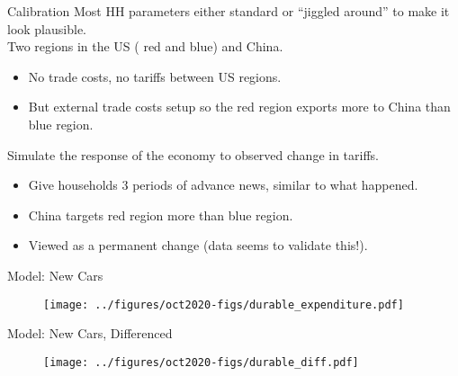 \documentclass[9pt,pdftex,aspectratio=1610]{beamer}
\theoremstyle{definition}
\begin{document}
\begin{frame}[t]{Calibration}
\medskip
Most HH parameters either standard or ``jiggled around'' to make it look plausible.\\
\bigskip
Two regions in the US ({\color{red} red} and {\color{blue} blue}) and China.
\begin{itemize}
\smallskip
\item No trade costs, no tariffs between US regions.
\smallskip
\item But external trade costs setup so the {\color{red} red} region exports more to China than {\color{blue} blue} region.
\end{itemize}
\bigskip
Simulate the response of the economy to observed change in tariffs.
\begin{itemize}
\smallskip
\item Give households 3 periods of advance news, similar to what happened.
\smallskip
\item China targets {\color{red} red} region more than {\color{blue} blue} region.
\smallskip
\item Viewed as a permanent change (data seems to validate this!).
\end{itemize}
\end{frame}


\begin{frame}[t]{Model: New Cars}
\begin{figure}[t]
\centerline{\texttt{[image: ../figures/oct2020-figs/durable\_expenditure.pdf]}}
\end{figure}
\end{frame}

\begin{frame}[t]{Model: New Cars, Differenced}
\begin{figure}[t]
\centerline{\texttt{[image: ../figures/oct2020-figs/durable\_diff.pdf]}}
\end{figure}
\end{frame}

\end{document}
